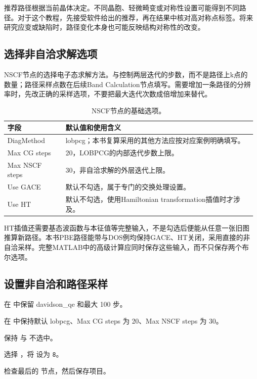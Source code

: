 推荐路径根据当前晶体决定。不同晶胞、轻微畸变或对称性设置可能得到不同路径。对于这个教程，先接受软件给出的推荐，再在结果中核对高对称点标签。将来研究应变或缺陷时，路径变化本身也可能反映结构对称性的改变。

\subsection{选择非自洽求解选项}

NSCF节点的选择电子态求解方法。与控制两层迭代的步数，而不是路径上k点的数量；路径采样点数在后续Band Calculation节点填写。需要增加一条路径的分辨率时，先改正确的采样选项，不要把最大迭代次数成倍增加来替代。

\begin{table}[htbp]
\centering
\caption{NSCF节点的基础选项。}
\begin{tabularx}{\linewidth}{lX}
\toprule
字段 & 默认值和使用含义 \\
\midrule
DiagMethod & lobpcg；本书复算采用的其他方法应按对应案例明确填写。 \\
Max CG steps & 20，LOBPCG的内部迭代步数上限。 \\
Max NSCF steps & 30，非自洽求解的外层迭代上限。 \\
Use GACE & 默认不勾选，属于专门的交换处理设置。 \\
Use HT & 默认不勾选，使用Hamiltonian transformation插值时才涉及。 \\
\bottomrule
\end{tabularx}
\end{table}

HT插值还需要基态波函数与本征值等完整输入，不是勾选后便能从任意一张旧图推算新路径。本书PBE路径能带与DOS例均保持GACE、HT关闭，采用直接的非自洽采样。完整MATLAB\regmark{}中的高级计算应同时保存这些输入，而不只保存两个布尔选项。


\subsection{设置非自洽和路径采样}

\begin{steps}
\item 在  中保留 davidson\_qe 和最大 100 步。
\item 在  中保持默认 lobpcg、Max CG steps 为 20、Max NSCF steps 为 30。
\item 保持  与  不选中。
\item 选择 ，将 \mbox{} 设为 \texttt{8}。
\item 检查最后的  节点，然后保存项目。
\end{steps}

